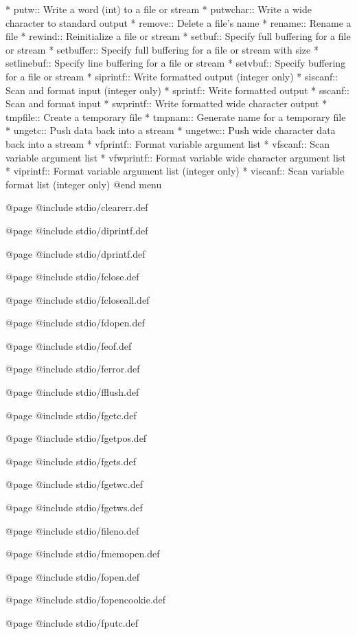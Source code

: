 * putw::        Write a word (int) to a file or stream
* putwchar::    Write a wide character to standard output
* remove::      Delete a file's name
* rename::      Rename a file
* rewind::      Reinitialize a file or stream
* setbuf::      Specify full buffering for a file or stream
* setbuffer::   Specify full buffering for a file or stream with size
* setlinebuf::  Specify line buffering for a file or stream
* setvbuf::     Specify buffering for a file or stream
* siprintf::    Write formatted output (integer only)
* siscanf::     Scan and format input (integer only)
* sprintf::     Write formatted output
* sscanf::      Scan and format input
* swprintf::    Write formatted wide character output
* tmpfile::     Create a temporary file
* tmpnam::      Generate name for a temporary file
* ungetc::      Push data back into a stream
* ungetwc::     Push wide character data back into a stream
* vfprintf::    Format variable argument list
* vfscanf::     Scan variable argument list
* vfwprintf::   Format variable wide character argument list
* viprintf::    Format variable argument list (integer only)
* viscanf::     Scan variable format list (integer only)
@end menu

@page
@include stdio/clearerr.def

@page
@include stdio/diprintf.def

@page
@include stdio/dprintf.def

@page
@include stdio/fclose.def

@page
@include stdio/fcloseall.def

@page
@include stdio/fdopen.def

@page
@include stdio/feof.def

@page
@include stdio/ferror.def

@page
@include stdio/fflush.def

@page
@include stdio/fgetc.def

@page
@include stdio/fgetpos.def

@page
@include stdio/fgets.def

@page
@include stdio/fgetwc.def

@page
@include stdio/fgetws.def

@page
@include stdio/fileno.def

@page
@include stdio/fmemopen.def

@page
@include stdio/fopen.def

@page
@include stdio/fopencookie.def

@page
@include stdio/fputc.def

